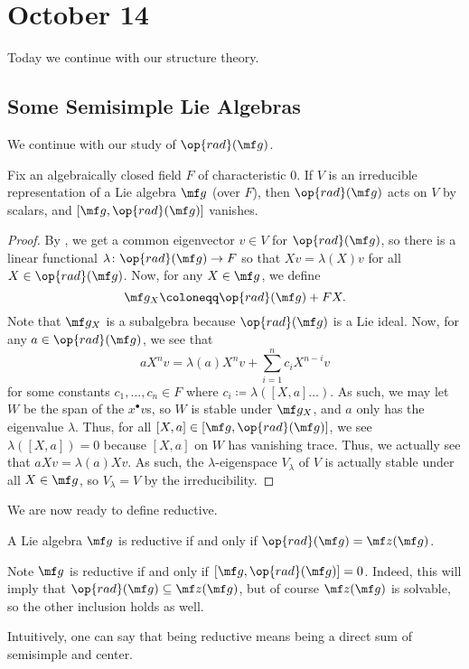 \documentclass[../notes.tex]{subfiles}
\begin{document}
\section{October 14}
Today we continue with our structure theory.

\subsection{Some Semisimple Lie Algebras}
We continue with our study of $\op{rad}(\mf g)$.
\begin{proposition}
	Fix an algebraically closed field $F$ of characteristic $0$. If $V$ is an irreducible representation of a Lie algebra $\mf g$ (over $F$), then $\op{rad}(\mf g)$ acts on $V$ by scalars, and $[\mf g,\op{rad}(\mf g)]$ vanishes.
\end{proposition}
\begin{proof}
	By , we get a common eigenvector $v\in V$ for $\op{rad}(\mf g)$, so there is a linear functional $\lambda\colon\op{rad}(\mf g)\to F$ so that $Xv=\lambda(X)v$ for all $X\in\op{rad}(\mf g)$. Now, for any $X\in\mf g$, we define
	\[\mf g_X\coloneqq\op{rad}(\mf g)+FX.\]
	Note that $\mf g_X$ is a subalgebra because $\op{rad}(\mf g)$ is a Lie ideal. Now, for any $a\in\op{rad}(\mf g)$, we see that
	\[aX^nv=\lambda(a)X^nv+\sum_{i=1}^nc_iX^{n-i}v\]
	for some constants $c_1,\ldots,c_n\in F$ where $c_i\coloneqq\lambda([X,a]\ldots)$. As such, we  may let $W$ be the span of the $x^\bullet v$s, so $W$ is stable under $\mf g_X$, and $a$ only has the eigenvalue $\lambda$. Thus, for all $[X,a]\in[\mf g,\op{rad}(\mf g)]$, we see $\lambda([X,a])=0$ because $[X,a]$ on $W$ has vanishing trace. Thus, we actually see that $aXv=\lambda(a)Xv$. As such, the $\lambda$-eigenspace $V_\lambda$ of $V$ is actually stable under all $X\in\mf g$, so $V_\lambda=V$ by the irreducibility.
\end{proof}
We are now ready to define reductive.
\begin{definition}[reductive]
	A Lie algebra $\mf g$ is reductive if and only if $\op{rad}(\mf g)=\mf z(\mf g)$.
\end{definition}
\begin{remark}
	Note $\mf g$ is reductive if and only if $[\mf g,\op{rad}(\mf g)]=0$. Indeed, this will imply that $\op{rad}(\mf g)\subseteq\mf z(\mf g)$, but of course $\mf z(\mf g)$ is solvable, so the other inclusion holds as well.
\end{remark}
\begin{remark}
	Intuitively, one can say that being reductive means being a direct sum of semisimple and center.
\end{remark}
\end{document}
